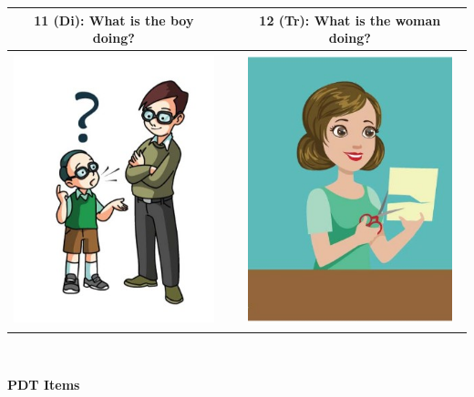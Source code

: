 \documentclass[12pt,notitlepage]{article}
\begin{document}
\begin{center}
\begin{tabular}{|c|c|c|}
\hline
11 (Di): What is the boy doing? && 12 (Tr): What is the woman doing? \\
\hline
\includegraphics[width=16em,trim=0 0 0 -3]{figures/I11.jpg} & & \includegraphics[width=16em,trim=0 0 0 -3]{figures/I12.jpg} \\
\hline
\end{tabular}
\vspace{1em} \\


\clearpage

{\Large \textbf{PDT Items}}

\vspace{2em}


\end{center}
\end{document}
